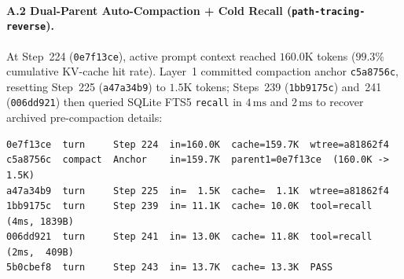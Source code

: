 \documentclass[11pt]{article}
\newcommand{\code}[1]{\nolinkurl{#1}}
\begin{document}
\paragraph{A.2 Dual-Parent Auto-Compaction + Cold Recall (\code{path-tracing-reverse}).}
At Step~224 (\texttt{0e7f13ce}), active prompt context reached $160.0\mathrm{K}$ tokens ($99.3\%$ cumulative KV-cache hit rate). Layer~1 committed compaction anchor \texttt{c5a8756c}, resetting Step~225 (\texttt{a47a34b9}) to $1.5\mathrm{K}$ tokens; Steps~239 (\texttt{1bb9175c}) and~241 (\texttt{006dd921}) then queried SQLite FTS5 \texttt{recall} in $4\,\mathrm{ms}$ and $2\,\mathrm{ms}$ to recover archived pre-compaction details:
\begin{lstlisting}
0e7f13ce  turn     Step 224  in=160.0K  cache=159.7K  wtree=a81862f4
c5a8756c  compact  Anchor    in=159.7K  parent1=0e7f13ce  (160.0K -> 1.5K)
a47a34b9  turn     Step 225  in=  1.5K  cache=  1.1K  wtree=a81862f4
1bb9175c  turn     Step 239  in= 11.1K  cache= 10.0K  tool=recall (4ms, 1839B)
006dd921  turn     Step 241  in= 13.0K  cache= 11.8K  tool=recall (2ms,  409B)
5b0cbef8  turn     Step 243  in= 13.7K  cache= 13.3K  PASS
\end{lstlisting}
\end{document}
